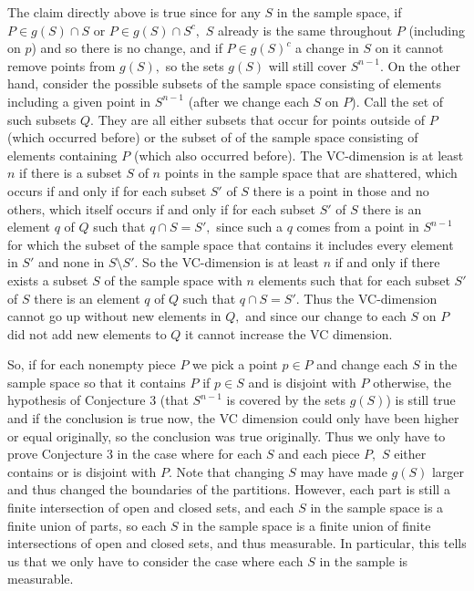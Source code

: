 \documentclass[12pt]{amsart}
\newcommand{\0}{\mat{0}}
\newcommand{\1}{\mathds{1}}
\begin{document}
The claim directly above is true since for any $S$ in the sample space, if $P \in g(S) \cap S$ or $P \in g(S) \cap S^c,$ $S$ already is the same throughout $P$ (including on $p$) and so there is no change, and if $P \in g(S)^c$ a change in $S$ on it cannot remove points from $g(S),$ so the sets $g(S)$ will still cover $S^{n - 1}.$ On the other hand, consider the possible subsets of the sample space consisting of elements including a given point in $S^{n - 1}$ (after we change each $S$ on $P$). Call the set of such subsets $Q.$ They are all either subsets that occur for points outside of $P$ (which occurred before) or the subset of of the sample space consisting of elements containing $P$ (which also occurred before). The VC-dimension is at least $n$ if there is a subset $S$ of $n$ points in the sample space that are shattered, which occurs if and only if for each subset $S'$ of $S$ there is a point in those and no others, which itself occurs if and only if for each subset $S'$ of $S$ there is an element $q$ of $Q$ such that $q \cap S = S',$ since such a $q$ comes from a point in $S^{n - 1}$ for which the subset of the sample space that contains it includes every element in $S'$ and none in $S \setminus S'.$ So the VC-dimension is at least $n$ if and only if there exists a subset $S$ of the sample space with $n$ elements such that for each subset $S'$ of $S$ there is an element $q$ of $Q$ such that $q \cap S = S'.$ Thus the VC-dimension cannot go up without new elements in $Q,$ and since our change to each $S$ on $P$ did not add new elements to $Q$ it cannot increase the VC dimension.

So, if for each nonempty piece $P$ we pick a point $p \in P$ and change each $S$ in the sample space so that it contains $P$ if $p \in S$ and is disjoint with $P$ otherwise, the hypothesis of Conjecture 3 (that $S^{n - 1}$ is covered by the sets $g(S)$) is still true and if the conclusion is true now, the VC dimension could only have been higher or equal originally, so the conclusion was true originally. Thus we only have to prove Conjecture 3 in the case where for each $S$ and each piece $P,$ $S$ either contains or is disjoint with $P.$ Note that changing $S$ may have made $g(S)$ larger and thus changed the boundaries of the partitions. However, each part is still a finite intersection of open and closed sets, and each $S$ in the sample space is a finite union of parts, so each $S$ in the sample space is a finite union of finite intersections of open and closed sets, and thus measurable. In particular, this tells us that we only have to consider the case where each $S$ in the sample is measurable.
\end{document}
